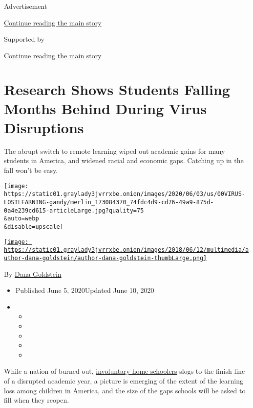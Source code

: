 Advertisement

\protect\hyperlink{after-top}{Continue reading the main story}

Supported by

\protect\hyperlink{after-sponsor}{Continue reading the main story}

\hypertarget{research-shows-students-falling-months-behind-during-virus-disruptions}{%
\section{Research Shows Students Falling Months Behind During Virus
Disruptions}\label{research-shows-students-falling-months-behind-during-virus-disruptions}}

The abrupt switch to remote learning wiped out academic gains for many
students in America, and widened racial and economic gaps. Catching up
in the fall won't be easy.

\texttt{[image: https://static01.graylady3jvrrxbe.onion/images/2020/06/03/us/00VIRUS-LOSTLEARNING-gandy/merlin\_173084370\_74fdc4d9-cd76-49a9-875d-0a4e239cd615-articleLarge.jpg?quality=75\\\&auto=webp\\\&disable=upscale]}

\href{https://www.nytimes3xbfgragh.onion/by/dana-goldstein}{\texttt{[image: https://static01.graylady3jvrrxbe.onion/images/2018/06/12/multimedia/author-dana-goldstein/author-dana-goldstein-thumbLarge.png]}}

By \href{https://www.nytimes3xbfgragh.onion/by/dana-goldstein}{Dana
Goldstein}

\begin{itemize}
\item
  Published June 5, 2020Updated June 10, 2020
\item
  \begin{itemize}
  \item
  \item
  \item
  \item
  \item
  \end{itemize}
\end{itemize}

While a nation of burned-out,
\href{https://www.nytimes3xbfgragh.onion/2020/04/06/us/coronavirus-schools-attendance-absent.html}{involuntary
home schoolers} slogs to the finish line of a disrupted academic year, a
picture is emerging of the extent of the learning loss among children in
America, and the size of the gaps schools will be asked to fill when
they reopen.


